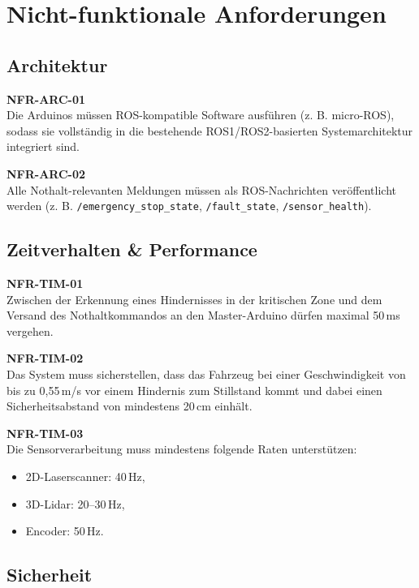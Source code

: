 \section{Nicht-funktionale Anforderungen}
\label{sec:nfr}

\subsection{Architektur}
\label{sec:nfr_architektur}

\textbf{NFR-ARC-01}\\
Die Arduinos müssen ROS-kompatible Software ausführen (z. B. micro-ROS), sodass sie vollständig in die bestehende ROS1/ROS2-basierten Systemarchitektur integriert sind.

\textbf{NFR-ARC-02}\\
Alle Nothalt-relevanten Meldungen müssen als ROS-Nachrichten veröffentlicht werden (z. B. \texttt{/emergency\_stop\_state}, \texttt{/fault\_state}, \texttt{/sensor\_health}).


\subsection{Zeitverhalten \& Performance}
\label{sec:nfr_time}

\textbf{NFR-TIM-01}\\
Zwischen der Erkennung eines Hindernisses in der kritischen Zone und dem Versand des Nothaltkommandos an den Master-Arduino dürfen maximal 50\,ms vergehen.

\textbf{NFR-TIM-02}\\
Das System muss sicherstellen, dass das Fahrzeug bei einer Geschwindigkeit von bis zu 0{,}55\,m/s vor einem Hindernis zum Stillstand kommt und dabei einen Sicherheitsabstand von mindestens 20\,cm einhält.

\textbf{NFR-TIM-03}\\
Die Sensorverarbeitung muss mindestens folgende Raten unterstützen:
\begin{itemize}
    \item 2D-Laserscanner: 40\,Hz,
    \item 3D-Lidar: 20--30\,Hz,
    \item Encoder: 50\,Hz.
\end{itemize}


\subsection{Sicherheit}
\label{sec:nfr_safety}

